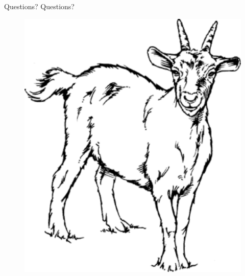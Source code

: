 \documentclass{beamer}
\begin{document}
\begin{frame}[fragile]{Questions?}
Questions?
\begin{figure}[here]
\begin{center}
\includegraphics[scale=0.5]{goat.pdf}
\end{center}
\end{figure}
\end{frame}
\end{document}
